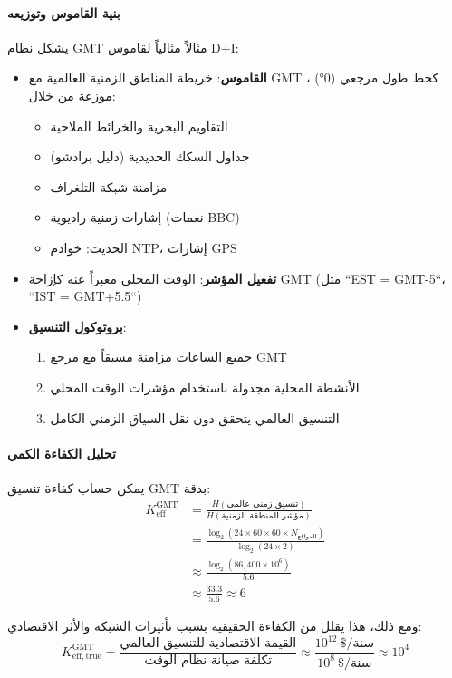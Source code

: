\documentclass[11pt,a4paper]{article}
\begin{document}
	\paragraph{بنية القاموس وتوزيعه}
	يشكل نظام GMT مثالاً مثالياً لقاموس D+I:
	\begin{itemize}
		\item \textbf{القاموس}: خريطة المناطق الزمنية العالمية مع GMT كخط طول مرجعي (0°) ، موزعة من خلال:
		\begin{itemize}
			\item التقاويم البحرية والخرائط الملاحية
			\item جداول السكك الحديدية (دليل برادشو)
			\item مزامنة شبكة التلغراف
			\item إشارات زمنية راديوية (نغمات BBC)
			\item الحديث: خوادم NTP، إشارات GPS
		\end{itemize}
		\item \textbf{تفعيل المؤشر}: الوقت المحلي معبراً عنه كإزاحة GMT (مثل ``EST = GMT-5``، ``IST = GMT+5.5``)
		\item \textbf{بروتوكول التنسيق}: 
		\begin{enumerate}
			\item جميع الساعات مزامنة مسبقاً مع مرجع GMT
			\item الأنشطة المحلية مجدولة باستخدام مؤشرات الوقت المحلي
			\item التنسيق العالمي يتحقق دون نقل السياق الزمني الكامل
		\end{enumerate}
	\end{itemize}
	
	\paragraph{تحليل الكفاءة الكمي}
	يمكن حساب كفاءة تنسيق GMT بدقة:
	\begin{align}
		K_{\mathrm{eff}}^{\mathrm{GMT}} &= \frac{H(\text{تنسيق زمني عالمي})}{H(\text{مؤشر المنطقة الزمنية})} \\
		&= \frac{\log_2\left(24 \times 60 \times 60 \times N_{\text{المواقع}}\right)}{\log_2(24 \times 2)} \\
		&\approx \frac{\log_2(86,400 \times 10^6)}{5.6} \\
		&\approx \frac{33.3}{5.6} \approx 6
	\end{align}
	
	ومع ذلك، هذا يقلل من الكفاءة الحقيقية بسبب تأثيرات الشبكة والأثر الاقتصادي:
	\begin{equation}
		K_{\mathrm{eff, true}}^{\mathrm{GMT}} = \frac{\text{القيمة الاقتصادية للتنسيق العالمي}}{\text{تكلفة صيانة نظام الوقت}} \approx \frac{10^{12}\ \text{\$/سنة}}{10^8\ \text{\$/سنة}} \approx 10^4
	\end{equation}
	
\end{document}
